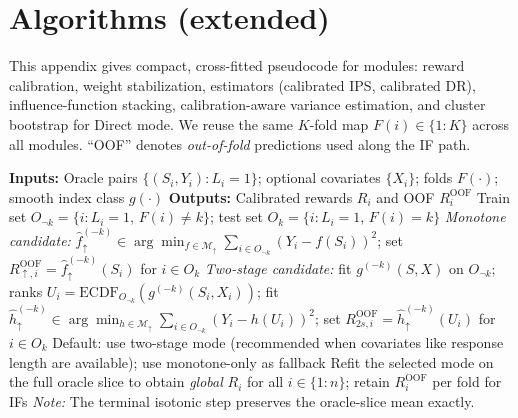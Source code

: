 \section{Algorithms (extended)}
\label{app:algorithms}

This appendix gives compact, cross-fitted pseudocode for \CJE{} modules: reward calibration, weight stabilization, estimators (calibrated IPS, calibrated DR), influence-function stacking, calibration-aware variance estimation, and cluster bootstrap for Direct mode. We reuse the same $K$-fold map $F(i)\!\in\!\{1{:}K\}$ across all modules. ``OOF'' denotes \emph{out-of-fold} predictions used along the IF path.

\begin{algorithm}[t]
\caption{\textsc{Reward-Calibration}: mean-preserving calibration (cross-fitted; automatic two-stage fallback)}
\label{alg:autocalr}
\begin{algorithmic}[1]
\STATE \textbf{Inputs:} Oracle pairs $\{(S_i,Y_i):L_i{=}1\}$; optional covariates $\{X_i\}$; folds $F(\cdot)$; smooth index class $g(\cdot)$
\STATE \textbf{Outputs:} Calibrated rewards $R_i$ and OOF $R^{\mathrm{OOF}}_i$
  \STATE Train set $O_{\neg k}\!=\!\{i:L_i{=}1,\,F(i)\neq k\}$; test set $O_k\!=\!\{i:L_i{=}1,\,F(i)=k\}$
  \STATE \emph{Monotone candidate:} $\hat f^{(-k)}_{\uparrow}\!\in\!\arg\min_{f\in \mathcal M_{\uparrow}}\sum_{i\in O_{\neg k}}(Y_i-f(S_i))^2$; set $R^{\mathrm{OOF}}_{\uparrow,i}\!=\!\hat f^{(-k)}_{\uparrow}(S_i)$ for $i\!\in\!O_k$
  \STATE \emph{Two-stage candidate:} fit $g^{(-k)}(S,X)$ on $O_{\neg k}$; ranks $U_i\!=\!\mathrm{ECDF}_{O_{\neg k}}(g^{(-k)}(S_i,X_i))$; fit $\hat h^{(-k)}_{\uparrow}\!\in\!\arg\min_{h\in \mathcal M_{\uparrow}}\sum_{i\in O_{\neg k}}(Y_i-h(U_i))^2$; set $R^{\mathrm{OOF}}_{2s,i}\!=\!\hat h^{(-k)}_{\uparrow}(U_i)$ for $i\!\in\!O_k$
\ENDFOR
\STATE Default: use two-stage mode (recommended when covariates like response length are available); use monotone-only as fallback
\STATE Refit the selected mode on the full oracle slice to obtain \emph{global} $R_i$ for all $i\in\{1{:}n\}$; retain $R^{\mathrm{OOF}}_i$ per fold for IFs
\STATE \textit{Note:} The terminal isotonic step preserves the oracle-slice mean exactly.
\end{algorithmic}
\end{algorithm}

